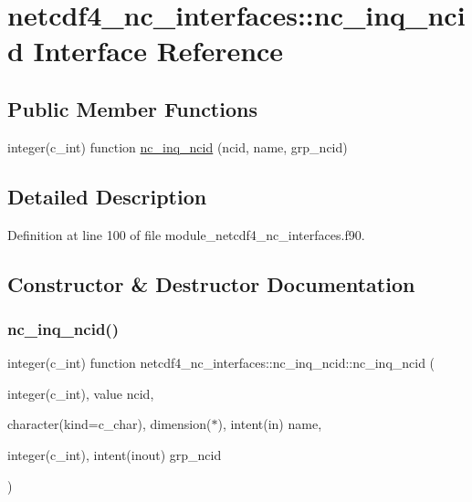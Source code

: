 \hypertarget{interfacenetcdf4__nc__interfaces_1_1nc__inq__ncid}{}\section{netcdf4\+\_\+nc\+\_\+interfaces\+:\+:nc\+\_\+inq\+\_\+ncid Interface Reference}
\label{interfacenetcdf4__nc__interfaces_1_1nc__inq__ncid}
\subsection*{Public Member Functions}
\begin{DoxyCompactItemize}
\item 
integer(c\+\_\+int) function \hyperlink{interfacenetcdf4__nc__interfaces_1_1nc__inq__ncid_abe9f8e2c1d9a2738b15fbd2f6ac63634}{nc\+\_\+inq\+\_\+ncid} (ncid, name, grp\+\_\+ncid)
\end{DoxyCompactItemize}


\subsection{Detailed Description}


Definition at line 100 of file module\+\_\+netcdf4\+\_\+nc\+\_\+interfaces.\+f90.



\subsection{Constructor \& Destructor Documentation}
\mbox{\label{interfacenetcdf4__nc__interfaces_1_1nc__inq__ncid_abe9f8e2c1d9a2738b15fbd2f6ac63634}} 
\subsubsection{\texorpdfstring{nc\+\_\+inq\+\_\+ncid()}{nc\_inq\_ncid()}}
{\footnotesize\ttfamily integer(c\+\_\+int) function netcdf4\+\_\+nc\+\_\+interfaces\+::nc\+\_\+inq\+\_\+ncid\+::nc\+\_\+inq\+\_\+ncid (\begin{DoxyParamCaption}\item[{integer(c\+\_\+int), value}]{ncid,  }\item[{character(kind=c\+\_\+char), dimension($\ast$), intent(in)}]{name,  }\item[{integer(c\+\_\+int), intent(inout)}]{grp\+\_\+ncid }\end{DoxyParamCaption})}



